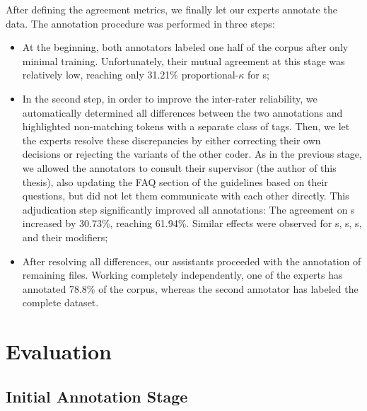 After defining the agreement metrics, we finally let our experts
annotate the data.  The annotation procedure was performed in three
steps:
\begin{itemize}
  \item At the beginning, both annotators labeled one half of the
    corpus after only minimal training.  Unfortunately, their mutual
    agreement at this stage was relatively low, reaching only 31.21\%
    proportional-$\kappa$ for s;
  \item In the second step, in order to improve the inter-rater
    reliability, we automatically determined all differences between
    the two annotations and highlighted non-matching tokens with a
    separate class of tags.  Then, we let the experts resolve these
    discrepancies by either correcting their own decisions or
    rejecting the variants of the other coder.  As in the previous
    stage, we allowed the annotators to consult their supervisor (the
    author of this thesis), also updating the FAQ section of the
    guidelines based on their questions, but did not let them
    communicate with each other directly.  This adjudication step
    significantly improved all annotations: The agreement on
    s increased by 30.73\%, reaching 61.94\%.
    Similar effects were observed for s,
    s, s, and their modifiers;
  \item After resolving all differences, our assistants proceeded with
    the annotation of remaining files.  Working completely
    independently, one of the experts has annotated 78.8\% of the
    corpus, whereas the second annotator has labeled the complete
    dataset.
\end{itemize}

\section{Evaluation}\label{sec:eval}

\subsection{Initial Annotation Stage}\label{subsec:eval-initial-stage}

